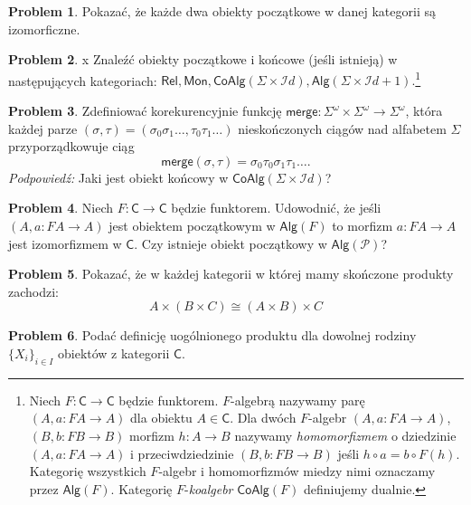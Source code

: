 \documentclass[10pt]{amsart}
\theoremstyle{plain}
\theoremstyle{definition}
\newtheorem{problem}{Problem}
\numberwithin{equation}{section}
\begin{document}
\begin{problem}
Pokazać, że każde dwa obiekty początkowe w danej kategorii są izomorficzne. 
\end{problem}

\begin{problem}x
Znaleźć obiekty początkowe i końcowe (jeśli istnieją) w następujących kategoriach:
$
\mathsf{Rel},  \mathsf{Mon},\mathsf{CoAlg}(\Sigma\times \mathcal{I}d), \mathsf{Alg}(\Sigma\times \mathcal{I}d+1).
$\footnote{Niech $F:\mathsf{C}\to \mathsf{C}$ będzie funktorem. $F$-algebrą nazywamy parę $(A,a:FA\to A)$ dla obiektu $A\in \mathsf{C}$. Dla dwóch $F$-algebr $(A,a:FA\to A)$, $(B,b:FB\to B)$ morfizm $h:A\to B$ nazywamy \emph{homomorfizmem} o dziedzinie $(A,a:FA\to A)$ i przeciwdziedzinie $(B,b:FB\to B)$ jeśli $h\circ a = b\circ F(h)$.  Kategorię wszystkich $F$-algebr i homomorfizmów miedzy nimi oznaczamy przez $\mathsf{Alg}(F)$. Kategorię $F$-\emph{koalgebr} $\mathsf{CoAlg}(F)$ definiujemy dualnie.}
\end{problem}

\begin{problem}
Zdefiniować korekurencyjnie funkcję $\mathsf{merge}:\Sigma^\omega \times \Sigma^\omega \to \Sigma^\omega$, która każdej parze $(\sigma,\tau)=(\sigma_0\sigma_1\ldots,\tau_0\tau_1\ldots)$ nieskończonych ciągów nad alfabetem $\Sigma$ przyporządkowuje ciąg $$\mathsf{merge}(\sigma,\tau) = \sigma_0\tau_0\sigma_1\tau_1\ldots.$$
\noindent \emph{Podpowiedź:} Jaki jest obiekt końcowy w $\mathsf{CoAlg}(\Sigma\times \mathcal{I}d)$?    
\end{problem}

\begin{problem}
Niech $F:\mathsf{C}\to \mathsf{C}$ będzie funktorem. Udowodnić, że jeśli $(A,a:FA\to A)$ jest obiektem początkowym w $\mathsf{Alg}(F)$ to morfizm $a:FA\to A$ jest izomorfizmem w $\mathsf{C}$. Czy istnieje obiekt początkowy w $\mathsf{Alg}(\mathcal{P})$?
\end{problem}


\begin{problem}
Pokazać, że w każdej kategorii w której mamy skończone produkty zachodzi:
$$
A\times (B\times C) \cong (A\times B)\times C
$$
\end{problem}


\begin{problem}
Podać definicję uogólnionego produktu dla dowolnej rodziny $\{X_i\}_{i\in I}$ obiektów z kategorii $\mathsf{C}$. 
\end{problem}
\end{document}
